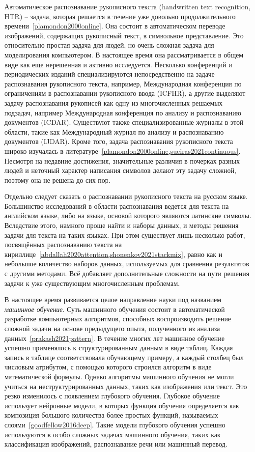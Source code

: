 Автоматическое распознавание рукописного текста (handwritten text recognition, HTR) -- задача, которая решается в течение уже довольно продолжительного времени~\ref{plamondon2000online}.
Она состоит в автоматическом переводе изображений, содержащих рукописный текст, в символьное представление.
Это относительно простая задача для людей, но очень сложная задача для моделирования компьютером.
В настоящее время она рассматривается в общем виде как еще нерешенная и активно исследуется.
Несколько конференций и периодических изданий специализируются непосредственно на задаче распознавания рукописного текста, например,
Международная конференция по ограничениям в распознавании рукописного ввода (ICFHR),
а другие выделяют задачу распознавания рукописей как одну из многочисленных решаемых подзадач,
например Международная конференция по анализу и распознаванию документов (ICDAR).
Существуют также специализированные журналы в этой области, такие как Международный журнал по анализу и распознаванию документов (IJDAR).
Кроме того, задача распознавания рукописного текста широко изучалась в литературе~\ref{plamondon2000online,sueiras2021continuous}.
Несмотря на недавние достижения, значительные различия в почерках разных людей и неточный характер написания символов
делают эту задачу сложной, поэтому она не решена до сих пор.

Отдельно следует сказать о распознавании рукописного текста на русском языке.
Большинство исследований в области распознавания ведется для текста на английском языке, либо на языке, основой которого являются латинские символы.
Вследствие этого, намного проще найти и наборы данных, и методы решения задачи для текста на таких языках.
При этом существует лишь несколько работ, посвящённых распознаванию текста на кириллице~\ref{abdallah2020attention,shonenkov2021stackmix},
равно как и небольшое количество наборов данных, используемых для сравнения результатов с другими методами.
Всё добавляет дополнительные сложности на пути решения задачи к уже существующим многочисленным проблемам.

В настоящее время развивается целое направление науки под названием \textit{машинное обучение}.
Суть машинного обучения состоит в автоматической разработке компьютерных алгоритмов,
способных воспроизводить решение сложной задачи на основе предыдущего опыта, полученного из анализа данных~\ref{prakash2021pattern}.
В течение многих лет машинное обучение успешно применялось к структурированным данным в виде таблиц.
Каждая запись в таблице соответствовала обучающему примеру, а каждый столбец был числовым атрибутом, с помощью которого строился алгоритм в виде математической формулы.
Однако алгоритмы машинного обучения не могли учиться на неструктурированных данных, таких как изображения или текст.
Это резко изменилось с появлением глубокого обучения.
Глубокое обучение использует нейронные модели, в которых функция обучения определяется как композиция
большого количества более простых функций, называемых слоями~\ref{goodfellow2016deep}.
Такие модели глубокого обучения успешно используются в особо сложных задачах машинного обучения,
таких как классификация изображений, распознавание речи или машинный перевод.

